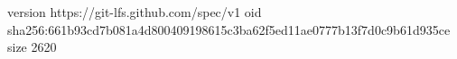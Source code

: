 version https://git-lfs.github.com/spec/v1
oid sha256:661b93cd7b081a4d800409198615c3ba62f5ed11ae0777b13f7d0c9b61d935ce
size 2620
